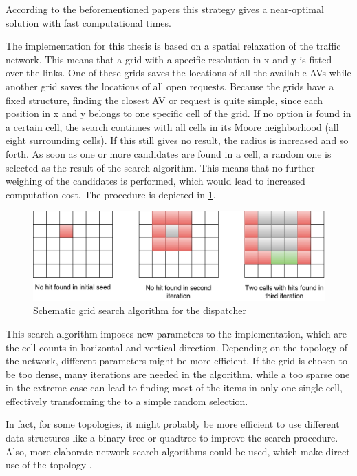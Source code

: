 According to the beforementioned papers this strategy gives a near-optimal solution
with fast computational times.

The implementation for this thesis is based on a spatial relaxation of the traffic
network. This means that a grid with a specific resolution in x and y is fitted
over the links. One of these grids saves the locations of all the available AVs
while another grid saves the locations of all open requests. Because the grids have
a fixed structure, finding the closest AV or request is quite simple, since each
position in x and y belongs to one specific cell of the grid. If no option is found
in a certain cell, the search continues with all cells in its Moore neighborhood
(all eight surrounding cells). If this still gives no result, the radius is increased
and so forth. As soon as one or more candidates are found in a cell, a random one is
selected as the result of the search algorithm. This means that no further weighing
of the candidates is performed, which would lead to increased computation cost.
The procedure is depicted in \cref{fig:gridsearch}.

\begin{figure}
    \centering
    \includegraphics[width=1.0\textwidth]{figures/gridsearch.pdf}
    \caption{Schematic grid search algorithm for the dispatcher}
    \label{fig:gridsearch}
\end{figure}

This search algorithm imposes new parameters to the implementation, which
are the cell counts in horizontal and vertical direction. Depending on the topology
of the network, different parameters might be more efficient. If the grid is chosen
to be too dense, many iterations are needed in the algorithm, while a too sparse one
in the extreme case can lead to finding most of the items in only one single cell, effectively
transforming the to a simple random selection.

In fact, for some topologies, it might probably be more efficient to use different
data structures like a binary tree or quadtree to improve the search procedure.
Also, more elaborate network search algorithms could be used, which make direct use
of the topology \citep{ChenSpatial14}.

